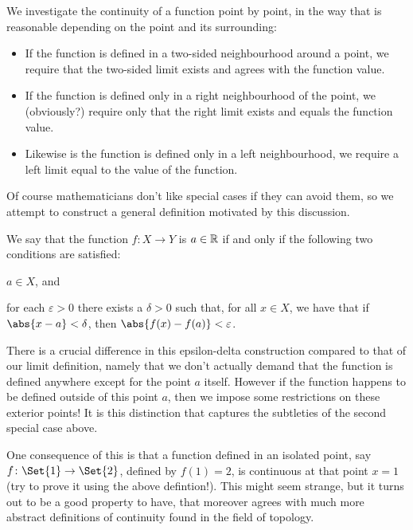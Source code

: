 We investigate the continuity of a function point by point, in the way that is reasonable depending on the point and its surrounding:
\begin{itemize}
	\item If the function is defined in a two-sided neighbourhood around a point, we require that the two-sided limit exists and agrees with the function value.
	\item If the function is defined only in a right neighbourhood of the point, we (obviously?) require only that the right limit exists and equals the function value.
	\item Likewise is the function is defined only in a left neighbourhood, we require a left limit equal to the value of the function.
\end{itemize}

\noindent
Of course mathematicians don't like special cases if they can avoid them, so we attempt to construct a general definition motivated by this discussion.


\begin{definition}
	We say that the function $f \colon X \to Y$ is  $a \in \mathbb{R}$ if and only if the following two conditions are satisfied:
	\begin{romanlist}
		\item $a \in X$, and
		\item for each $\varepsilon > 0$ there exists a $\delta > 0$ such that, for all $x \in X$, we have that if $\abs{x - a} < \delta$, then $\abs{f(x) - f(a)} < \varepsilon$.
	\end{romanlist}
\end{definition}

\begin{remark}
	There is a crucial difference in this epsilon-delta construction compared to that of our limit definition, namely that we don't actually demand that the function is defined anywhere except for the point $a$ itself. However if the function happens to be defined outside of this point $a$, then we impose some restrictions on these exterior points! It is this distinction that captures the subtleties of the second special case above.

	One consequence of this is that a function defined in an isolated point, say $f \colon \Set{1} \to \Set{2}$, defined by $f(1) = 2$, is continuous at that point $x = 1$ (try to prove it using the above defintion!). This might seem strange, but it turns out to be a good property to have, that moreover agrees with much more abstract definitions of continuity found in the field of topology.
\end{remark}

